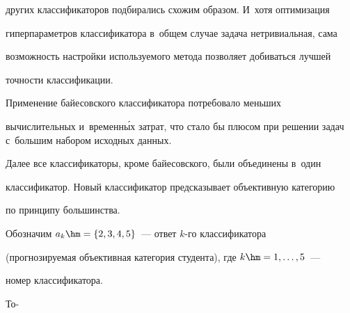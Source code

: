 других классификаторов подбирались схожим образом. И~хотя оптимизация 


гиперпараметров классификатора в~общем случае задача нетривиальная, сама 


возможность настройки используемого метода позволяет добиваться лучшей 


точности классификации. 


     


     Применение байесовского классификатора потребовало меньших 


вычислительных и~временн\'{ы}х затрат, что стало бы плюсом при решении задач с~большим набором исходных данных. 


     


     Далее все классификаторы, кроме байесовского, были объединены в~один 


классификатор. Новый классификатор предсказывает объективную категорию 


по принципу большинства. 











     


     Обозначим $a_k\hm= \{2,3,4,5\}$~--- ответ $k$-го классификатора 


(прогнозируемая объективная категория студента), где $k\hm= 1, \ldots , 5$~--- 


номер классификатора.




     То-\linebreak\vspace*{-12pt}


     


     \renewcommand{\figurename}{\protect\bf Таблица}


\setcounter{figure}{1}





